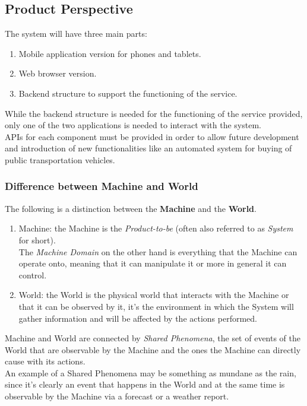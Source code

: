 \subsection{Product Perspective}
The system will have three main parts:
\begin{enumerate}
\item Mobile application version for phones and tablets.
\item Web browser version.
\item Backend structure to support the functioning of the service.
\end{enumerate}
While the backend structure is needed for the functioning of the service provided, only one of the two applications is needed to interact with the system.\\
APIs for each component must be provided in order to allow future development and introduction of new functionalities like an automated system for buying of public transportation vehicles.\par
\subsubsection*{Difference between Machine and World}
The following is a distinction between the \textbf{Machine} and the \textbf{World}.
\begin{enumerate}
\item Machine: the Machine is the \textit{Product-to-be} (often also referred to as \textit{System} for short).
\\The \textit{Machine Domain} on the other hand is everything that the Machine can operate onto, meaning that it can manipulate it or more in general it can control.
\item World: the World is the physical world that interacts with the Machine or that it can be observed by it, it's the environment in which the System will gather information and will be affected by the actions performed.
\end{enumerate}
Machine and World are connected by \textit{Shared Phenomena}, the set of events of the World that are observable by the Machine and the ones the Machine can directly cause with its actions.
\\An example of a Shared Phenomena may be something as mundane as the rain, since it's clearly an event that happens in the World and at the same time is observable by the Machine via a forecast or a weather report. 
